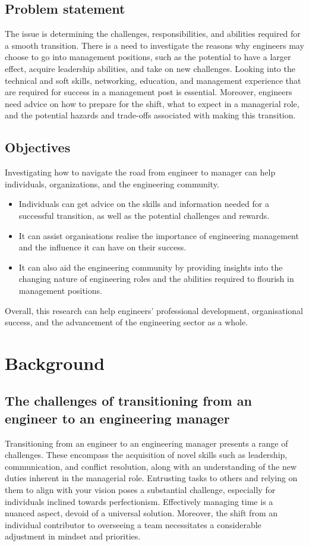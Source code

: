 \documentclass[runningheads]{article}
\begin{document}
\subsection{Problem statement}
The issue is determining the challenges, responsibilities, and abilities required for a smooth transition. There is a need to investigate the reasons why engineers may choose to go into management positions, such as the potential to have a larger effect, acquire leadership abilities, and take on new challenges. Looking into the technical and soft skills, networking, education, and management experience that are required for success in a management post is essential. Moreover, engineers need advice on how to prepare for the shift, what to expect in a managerial role, and the potential hazards and trade-offs associated with making this transition.

\subsection{Objectives}
Investigating how to navigate the road from engineer to manager can help individuals, organizations, and the engineering community.
\begin{itemize}
    \item Individuals can get advice on the skills and information needed for a successful transition, as well as the potential challenges and rewards.
    \item It can assist organisations realise the importance of engineering management and the influence it can have on their success.
    \item It can also aid the engineering community by providing insights into the changing nature of engineering roles and the abilities required to flourish in management positions. 
\end{itemize}
Overall, this research can help engineers' professional development, organisational success, and the advancement of the engineering sector as a whole.

\section{Background}
\subsection{The challenges of transitioning from an engineer to an engineering manager}

Transitioning from an engineer to an engineering manager presents a range of challenges. These encompass the acquisition of novel skills such as leadership, communication, and conflict resolution, along with an understanding of the new duties inherent in the managerial role. Entrusting tasks to others and relying on them to align with your vision poses a substantial challenge, especially for individuals inclined towards perfectionism. Effectively managing time is a nuanced aspect, devoid of a universal solution. Moreover, the shift from an individual contributor to overseeing a team necessitates a considerable adjustment in mindset and priorities.
\end{document}
